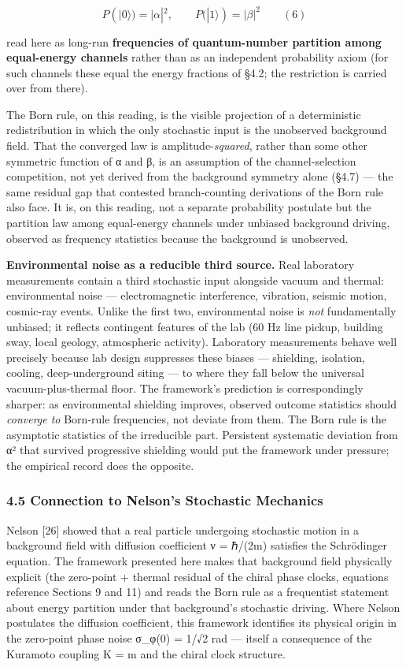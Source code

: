 \documentclass[
]{article}
\begin{document}
\[P(|0\rangle) = |\alpha|^2, \qquad P(|1\rangle) = |\beta|^2 \qquad (6)\]

read here as long-run \textbf{frequencies of quantum-number partition
among equal-energy channels} rather than as an independent probability
axiom (for such channels these equal the energy fractions of §4.2; the
restriction is carried over from there).

The Born rule, on this reading, is the visible projection of a
deterministic redistribution in which the only stochastic input is the
unobserved background field. That the converged law is
amplitude-\emph{squared}, rather than some other symmetric function of α
and β, is an assumption of the channel-selection competition, not yet
derived from the background symmetry alone (§4.7) --- the same residual
gap that contested branch-counting derivations of the Born rule also
face. It is, on this reading, not a separate probability postulate but
the partition law among equal-energy channels under unbiased background
driving, observed as frequency statistics because the background is
unobserved.

\textbf{Environmental noise as a reducible third source.} Real
laboratory measurements contain a third stochastic input alongside
vacuum and thermal: environmental noise --- electromagnetic
interference, vibration, seismic motion, cosmic-ray events. Unlike the
first two, environmental noise is \emph{not} fundamentally unbiased; it
reflects contingent features of the lab (60 Hz line pickup, building
sway, local geology, atmospheric activity). Laboratory measurements
behave well precisely because lab design suppresses these biases ---
shielding, isolation, cooling, deep-underground siting --- to where they
fall below the universal vacuum-plus-thermal floor. The framework's
prediction is correspondingly sharper: as environmental shielding
improves, observed outcome statistics should \emph{converge to}
Born-rule frequencies, not deviate from them. The Born rule is the
asymptotic statistics of the irreducible part. Persistent systematic
deviation from \textbar α\textbar² that survived progressive shielding
would put the framework under pressure; the empirical record does the
opposite.

\subsubsection{4.5 Connection to Nelson's Stochastic
Mechanics}\label{connection-to-nelsons-stochastic-mechanics}

Nelson {[}26{]} showed that a real particle undergoing stochastic motion
in a background field with diffusion coefficient ν = ℏ/(2m) satisfies
the Schrödinger equation. The framework presented here makes that
background field physically explicit (the zero-point + thermal residual
of the chiral phase clocks, equations reference Sections 9 and 11) and
reads the Born rule as a frequentist statement about energy partition
under that background's stochastic driving. Where Nelson postulates the
diffusion coefficient, this framework identifies its physical origin in
the zero-point phase noise σ\_φ(0) = 1/√2 rad --- itself a consequence
of the Kuramoto coupling K = m and the chiral clock structure.
\end{document}
